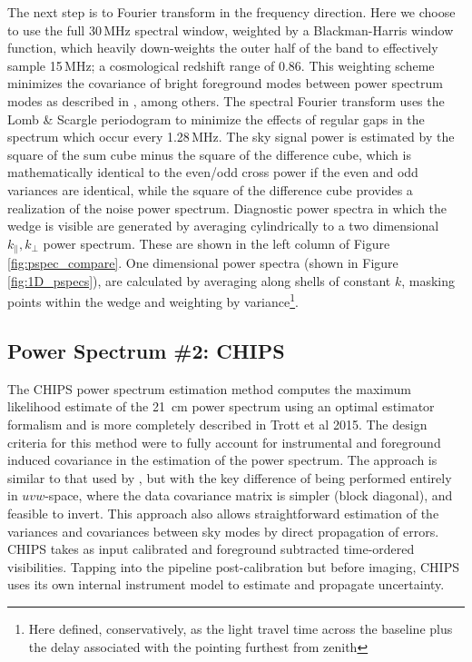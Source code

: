 \documentclass[twolcolumn,iop]{emulateapj}
\def\chipscite{Trott et al 2015}
\begin{document}
The next step is to Fourier transform in the frequency direction. Here we choose to use the full 30\,MHz spectral window, weighted by a Blackman-Harris window function, which heavily down-weights the outer half of the band to effectively sample 15\,MHz; a cosmological redshift range of 0.86. This weighting scheme minimizes the covariance of bright foreground modes between power spectrum modes as described in \cite{Thyagarajan:2013p10039,Parsons:2012p8896,Vedantham:2012p9026}, among others.  The spectral Fourier transform uses the Lomb \& Scargle periodogram to minimize the effects of regular gaps in the spectrum which occur every 1.28\,MHz.    The sky signal power is  estimated by the square of the sum cube minus the square of the difference cube, which  is mathematically identical to the even/odd cross power if the even and odd variances are identical, while the square of the difference cube provides a realization of the noise power spectrum. Diagnostic power spectra in which the wedge is visible are generated by averaging cylindrically to a two dimensional $k_{\|},k_{\bot}$ power spectrum.  These are shown in the left column of Figure \ref{fig:pspec_compare}.  One dimensional power spectra (shown in Figure \ref{fig:1D_pspecs}), are calculated by averaging along shells of constant $k$, masking points within the wedge and weighting by variance\footnote{Here defined, conservatively, as the light travel time across the baseline plus the delay associated with the pointing furthest from zenith}.






\subsection{Power Spectrum \#2: CHIPS}
\label{sec:CHIPS}
The CHIPS power spectrum estimation method computes the maximum likelihood estimate of the 21~cm power spectrum using an optimal estimator formalism and is more completely described in \chipscite{}.  The design criteria for this method were to fully account for instrumental and foreground induced covariance in the estimation of the power spectrum.  The approach is similar to that used by \cite{Liu:2011p8763}, but with the key difference of being performed entirely in $uvw$-space, where the data covariance matrix is simpler (block diagonal), and feasible to invert. This approach also allows straightforward estimation of the variances and covariances between sky modes by direct propagation of errors. CHIPS takes as input calibrated and foreground subtracted time-ordered visibilities. Tapping into the pipeline post-calibration but before imaging, CHIPS uses its own internal instrument model to estimate and propagate uncertainty.	
\end{document}
